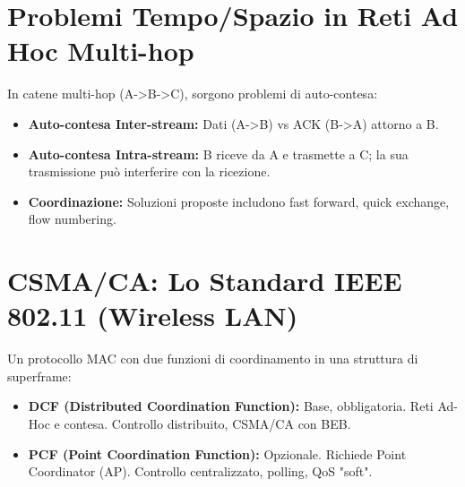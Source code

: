 \section{Problemi Tempo/Spazio in Reti Ad Hoc Multi-hop}
In catene multi-hop (A->B->C), sorgono problemi di auto-contesa:
\begin{itemize}
    \item \textbf{Auto-contesa Inter-stream:} Dati (A->B) vs ACK (B->A) attorno a B.
    \item \textbf{Auto-contesa Intra-stream:} B riceve da A e trasmette a C; la sua trasmissione può interferire con la ricezione.
    \item \textbf{Coordinazione:} Soluzioni proposte includono fast forward, quick exchange, flow numbering.
\end{itemize}

\section{CSMA/CA: Lo Standard IEEE 802.11 (Wireless LAN)}
Un protocollo MAC con due funzioni di coordinamento in una struttura di superframe:
\begin{itemize}
    \item \textbf{DCF (Distributed Coordination Function):} Base, obbligatoria. Reti Ad-Hoc e contesa. Controllo distribuito, CSMA/CA con BEB.
    \item \textbf{PCF (Point Coordination Function):} Opzionale. Richiede Point Coordinator (AP). Controllo centralizzato, polling, QoS "soft".
\end{itemize}

